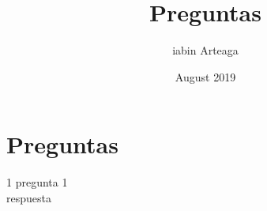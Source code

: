 \documentclass{article}
\title{Preguntas}
\author{iabin Arteaga}
\date{August 2019}
\begin{document}
\section{Preguntas}
1 pregunta 1\\
respuesta




\end{document}
